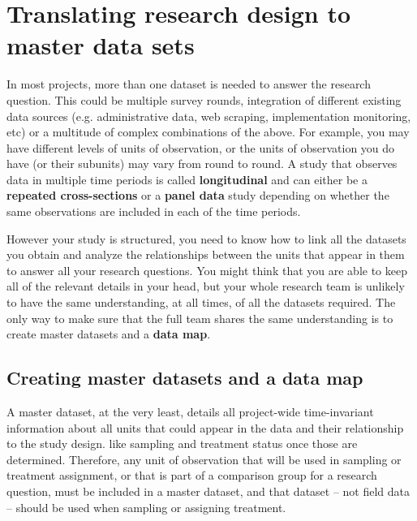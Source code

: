 
\section{Translating research design to master data sets}

In most projects, more than one dataset is needed to answer the research question.
This could be multiple survey rounds,
integration of different existing data sources (e.g. administrative data,
web scraping, implementation monitoring, etc)
or a multitude of complex combinations of the above.
For example, you may have different levels of units of observation,
or the units of observation you do have (or their subunits)
may vary from round to round.
A study that observes data in multiple time periods is called \textbf{longitudinal} and
can either be a \textbf{repeated cross-sections} or a \textbf{panel data} study
  
depending on whether the same observations are included in each of the time periods.

However your study is structured, you need to know how to link all the datasets you obtain
and analyze the relationships between the units that appear in them
to answer all your research questions.
You might think that you are able to keep all of the relevant details in your head,
but your whole research team is unlikely to have the same understanding,
at all times, of all the datasets required.
The only way to make sure that the full team shares the same understanding
is to create master datasets and a \textbf{data map}.

\subsection{Creating master datasets and a data map}

A master dataset, at the very least,
details all project-wide time-invariant information
about all units that could appear in the data
and their relationship to the study design.
like sampling and treatment status once those are determined.
Therefore, any unit of observation
that will be used in sampling or treatment assignment,
or that is part of a comparison group for a research question,
must be included in a master dataset,
and that dataset -- not field data --
should be used when sampling or assigning treatment.

